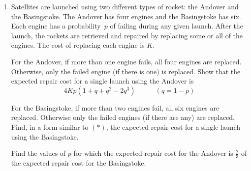 \documentclass[a4, 11pt]{report}
\newlength{\qspace}
\newcounter{qnumber}
\newenvironment{question}%
 {\vspace{\qspace}
  \begin{enumerate}[\bfseries 1\quad][10]%
    \setcounter{enumi}{\value{qnumber}}%
    \item%
 }
{
  \end{enumerate}
  \filbreak
  \stepcounter{qnumber}
 }
\begin{document}
\begin{question}
Satellites are launched using two different types of rocket: the
Andover and the Basingstoke. The Andover has four engines and the 
Basingstoke has six. Each engine has a probability~$p$ of
failing during any given launch. 
After the launch, the rockets are retrieved
and repaired by replacing some or all of the engines. The cost
of replacing each engine is $K$.

For the Andover, 
if  more than one engine fails, all four engines are replaced.
Otherwise, only the  failed engine (if there is one) is replaced.
Show that the expected repair cost for a single launch
using the Andover is 
\[
4Kp(1+q+q^2-2q^3) \ \ \ \ \ \ \ \ \ \ \ \ \ (q=1-p)
\tag{*}
\]

For the Basingstoke, if more than two engines fail, all six engines
are replaced. Otherwise only the failed engines (if there are any)
are replaced.
Find, in a form similar to $(*)$, the expected repair cost for 
a single launch using the  Basingstoke.

Find the values of $p$ for which the expected repair cost for the Andover
is  $\frac23$  of the expected repair cost for the Basingstoke.
\end{question}
\end{document}

